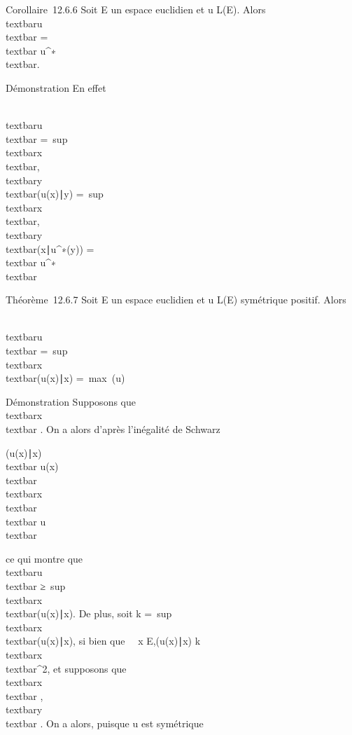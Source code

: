Corollaire~12.6.6 Soit E un espace euclidien et u \in L(E). Alors
\\textbar{}u\\textbar{}
=\\textbar{} u^∗\\textbar{}.

Démonstration En effet

\\textbar{}u\\textbar{}
=\
sup\\textbar{}x\\textbar{},\\textbar{}y\\textbar{}\textbar{}(u(x)∣y)\textbar{}
=\
sup\\textbar{}x\\textbar{}\leq1,\\textbar{}y\\textbar{}\leq1\textbar{}(x∣u^∗(y))\textbar{}
=\\textbar{} u^∗\\textbar{}

Théorème~12.6.7 Soit E un espace euclidien et u \in L(E) symétrique
positif. Alors

\\textbar{}u\\textbar{}
=\
sup\\textbar{}x\\textbar{}(u(x)∣x)
=\
max\lambda~\in{}(u)~\lambda~

Démonstration Supposons que
\\textbar{}x\\textbar{} . On a alors
d'après l'inégalité de Schwarz

(u(x)∣x) \leq\\textbar{}
u(x)\\textbar{}\\textbar{}x\\textbar{}
\leq\\textbar{} u\\textbar{}

ce qui montre que \\textbar{}u\\textbar{}
≥\
sup\\textbar{}x\\textbar{}(u(x)∣x).
De plus, soit k =\
sup\\textbar{}x\\textbar{}\leq1(u(x)∣x),
si bien que \forall~~x \in
E,(u(x)∣x) \leq
k\\textbar{}x\\textbar{}^2, et
supposons que \\textbar{}x\\textbar{} ,\\textbar{}y\\textbar{} \leq 1. On a alors,
puisque u est symétrique

